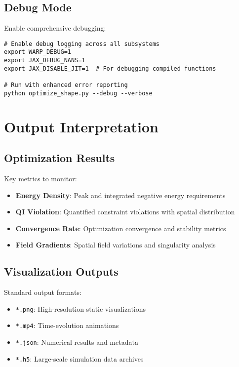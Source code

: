 \documentclass{article}
\begin{document}
\subsection{Debug Mode}

Enable comprehensive debugging:

\begin{lstlisting}
# Enable debug logging across all subsystems
export WARP_DEBUG=1
export JAX_DEBUG_NANS=1
export JAX_DISABLE_JIT=1  # For debugging compiled functions

# Run with enhanced error reporting
python optimize_shape.py --debug --verbose
\end{lstlisting}

\section{Output Interpretation}

\subsection{Optimization Results}

Key metrics to monitor:

\begin{itemize}
\item \textbf{Energy Density}: Peak and integrated negative energy requirements
\item \textbf{QI Violation}: Quantified constraint violations with spatial distribution
\item \textbf{Convergence Rate}: Optimization convergence and stability metrics
\item \textbf{Field Gradients}: Spatial field variations and singularity analysis
\end{itemize}

\subsection{Visualization Outputs}

Standard output formats:

\begin{itemize}
\item \texttt{*.png}: High-resolution static visualizations
\item \texttt{*.mp4}: Time-evolution animations
\item \texttt{*.json}: Numerical results and metadata
\item \texttt{*.h5}: Large-scale simulation data archives
\end{itemize}
\end{document}
